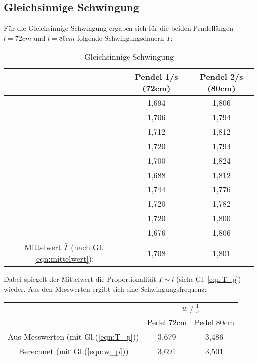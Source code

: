\subsection{Gleichsinnige Schwingung}
Für die Gleichsinnige Schwingung ergaben sich für die beiden Pendellängen $l=72cm$ und $l=80cm$
folgende Schwingungsdauern $T$:
\begin{table}
    \centering
    \label{tab:Data_gleichphasig}
    \begin{tabular}{c c | c}
        \toprule
        & Pendel 1\;/\;s (72cm) & Pendel 2\;/\;s (80cm)\\
        \midrule
            & 1,694 & 1,806 \\
            & 1,706 & 1,794 \\
            & 1,712 & 1,812 \\
            & 1,720 & 1,794 \\
            & 1,700 & 1,824 \\
            & 1,688 & 1,812 \\
            & 1,744 & 1,776 \\
            & 1,720 & 1,782 \\
            & 1,720 & 1,800 \\
            & 1,676 & 1,806 \\        
        \midrule
        Mittelwert $\bar{T}$ (nach Gl. \ref{eqn:mittelwert}): & 1,708 & 1,801 \\
        \bottomrule
    \end{tabular}
    \caption{Gleichsinnige Schwingung}
\end{table}

Dabei spiegelt der Mittelwert die Proportionalität $T \sim l$ (siehe Gl. \ref{eqn:T_p}) wieder.\newline
Aus den Messwerten ergibt sich eine Schwingungsfrequenz:
\begin{table}
    \centering
    \label{tab:frq_gleichs}
    \begin{tabular}{c c c}
        \toprule
        & \multicolumn{2}{c}{$w\;/\;\frac{1}{s}$}\\
        \cmidrule(lr){2-3} 
        & Pedel 72cm & Pedel 80cm\\
        \midrule
        Aus Messwerten (mit Gl.(\ref{eqn:T_p})) & 3,679 & 3,486 \\
        Berechnet (mit Gl.(\ref{eqn:w_p}))      & 3,691 & 3,501 \\
        \bottomrule
    \end{tabular}
\end{table}
\newpage

